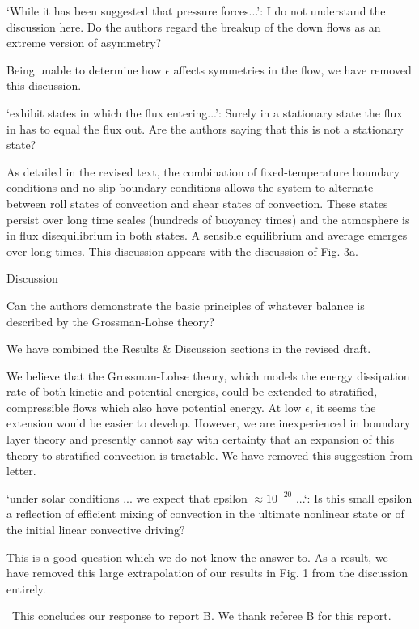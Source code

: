 \documentclass[aps, 11pt, singlecolumn]{revtex4-1} %
\begin{document}
\begin{singlespace}
\begin{myquotation}
`While it has been suggested that pressure forces...': I do not
understand the discussion here. Do the authors regard the breakup of
the down flows as an extreme version of asymmetry?
\end{myquotation}
Being unable to determine how $\epsilon$ affects symmetries in the
flow, we have removed this discussion.

\begin{myquotation}
`exhibit states in which the flux entering...': Surely in a
stationary state the flux in has to equal the flux out. Are the
authors saying that this is not a stationary state?
\end{myquotation}
As detailed in the revised text, the combination of fixed-temperature
boundary conditions and no-slip boundary conditions allows the system to alternate between
roll states of convection and shear states of convection.  These states persist over long
time scales (hundreds of buoyancy times) and the atmosphere is in flux disequilibrium in both states.
A sensible equilibrium and average emerges over long times.  This discussion appears with
the discussion of Fig. 3a.

\begin{myquotation}
Discussion

Can the authors demonstrate the basic principles of whatever balance
is described by the Grossman-Lohse theory?
\end{myquotation}
We have combined the Results \& Discussion sections in the revised draft.

We believe that the Grossman-Lohse theory, which models the energy dissipation rate of both
kinetic and potential energies, could be extended to stratified, compressible flows which also
have potential energy.  At low $\epsilon$, it seems the extension would be easier to
develop. However, we are inexperienced in boundary layer theory and presently 
cannot say with certainty that an expansion of this theory to stratified convection is tractable. 
We have removed this suggestion from letter.  


\begin{myquotation}
`under solar conditions ... we expect that epsilon  $\approx 10^{-20}$
...`: Is this small epsilon a reflection of efficient mixing of
convection in the ultimate nonlinear state or of the initial linear
convective driving?
\end{myquotation}
This is a good question which we do not know the answer to.  As a result, we have
removed this large extrapolation of our results in Fig. 1 from the discussion
entirely.

$\,$\newline\noindent
This concludes our response to report B.  We thank referee B for this report.

$\,$
\newline
\noindent


\end{singlespace}





\end{document}
